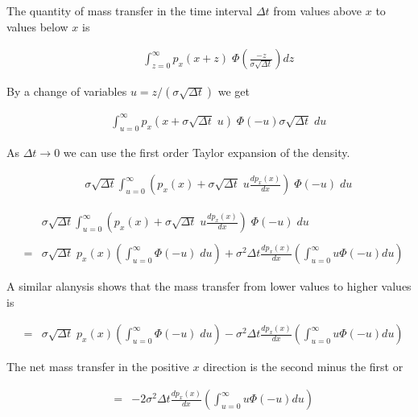 {
{\Large

The quantity of mass transfer in the time interval $\Delta t$ from values above $x$ to values below $x$ is


\begin{eqnarray*}
&  & \int_{z = 0}^\infty p_x(x+z)\;\Phi\left(\frac{-z}{\sigma\sqrt{\Delta t}}\right) dz
\end{eqnarray*}

By a change of variables $u = z/(\sigma\sqrt{\Delta t})$ we get

\begin{eqnarray*}
&  & \int_{u = 0}^\infty p_x(x+\sigma\sqrt{\Delta t}\;u)\;\Phi(-u) \sigma\sqrt{\Delta t}\;du
\end{eqnarray*}

\vfill
As $\Delta t \rightarrow 0$ we can use the first order Taylor expansion of the density.

\begin{eqnarray*}
&  & \sigma\sqrt{\Delta t} \int_{u = 0}^\infty \left(p_x(x)+\sigma\sqrt{\Delta t}\;u \frac{dp_x(x)}{dx}\right)\;\Phi(-u)\;du
\end{eqnarray*}
}

{\Large

\begin{eqnarray*}
&  & \sigma\sqrt{\Delta t} \int_{u = 0}^\infty \left(p_x(x)+\sigma\sqrt{\Delta t}\;u \frac{dp_x(x)}{dx}\right)\;\Phi(-u)\;du \\
\\
& = & \sigma\sqrt{\Delta t}\;p_x(x)\left(\int_{u=0}^\infty \Phi(-u)\;du\right) +  \sigma^2\Delta t \frac{dp_x(x)}{dx} \left(\int_{u=0}^\infty u\Phi(-u) du\right)
\end{eqnarray*}

A similar alanysis shows that the mass transfer from lower values to higher values is

\begin{eqnarray*}
& = & \sigma\sqrt{\Delta t}\;p_x(x)\left(\int_{u=0}^\infty \Phi(-u)\;du\right) -  \sigma^2\Delta t \frac{dp_x(x)}{dx} \left(\int_{u=0}^\infty u\Phi(-u) du\right)
\end{eqnarray*}

\vfill
The net mass transfer in the positive $x$ direction is the second minus the first or

\begin{eqnarray*}
& = & - 2\sigma^2\Delta t \frac{dp_x(x)}{dx} \left(\int_{u=0}^\infty u\Phi(-u) du\right)
\end{eqnarray*}
}

}
